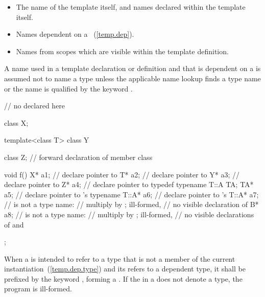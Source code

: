 \begin{itemize}
\item
The name of the template itself,
and names declared within the template itself.
\item
Names dependent on a
~(\ref{temp.dep}).
\item
Names from scopes which are visible within the template definition.
\end{itemize}

\pnum
A name used in a template declaration or definition and that is
dependent on a
is assumed not to name a type unless
the applicable name lookup finds a type name or the name
is qualified by the keyword
.
\enterexample

\begin{codeblock}
// no  declared here

class X;

template<class T> class Y {
  class Z;                      // forward declaration of member class

  void f() {
    X* a1;                      // declare pointer to 
    T* a2;                      // declare pointer to 
    Y* a3;                      // declare pointer to 
    Z* a4;                      // declare pointer to 
    typedef typename T::A TA;
    TA* a5;                     // declare pointer to 's 
    typename T::A* a6;          // declare pointer to 's 
    T::A* a7;                   //  is not a type name:
                                // multiply  by ; ill-formed,
                                // no visible declaration of 
    B* a8;                      //  is not a type name:
                                // multiply  by ; ill-formed,
                                // no visible declarations of  and 
  }
};
\end{codeblock}
\exitexample

\pnum
When a  is intended to refer to a type
that is not a member of the current instantiation~(\ref{temp.dep.type})
and its 
refers to a dependent type,
it shall be
prefixed by the keyword , forming a
.
If the  in a 
does not denote a type, the program is ill-formed.

